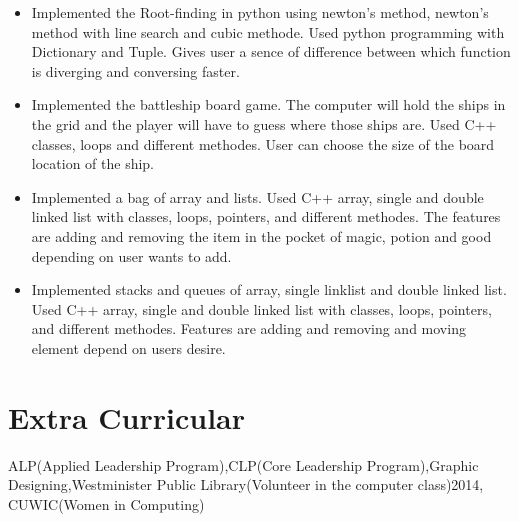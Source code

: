 \documentclass[10pt,a4paper,sans]{moderncv} %
\begin{document}
\begin{itemize}
\vspace{-6mm}
\item{Implemented the Root-finding in python using newton's method, newton's method with line search and cubic methode. Used python programming with Dictionary and Tuple. Gives user a sence of difference between which function is diverging and conversing faster.}
\end{itemize}
\begin{itemize}
\vspace{-6mm}
\item{Implemented the battleship board game. The computer will hold the ships in the grid and the player will have to guess where those ships are. Used C++ classes, loops and different methodes. User can choose the size of the board location of the ship.}
\end{itemize}
\begin{itemize}
\vspace{-6mm}
\item{Implemented a bag of array and lists. Used C++ array, single and double linked list with classes, loops, pointers, and different methodes. The features are adding and removing the item in the pocket of magic, potion and good depending on user wants to add.}
\end{itemize}
\begin{itemize}
\vspace{-6mm}
\item{Implemented stacks and queues of array, single linklist and double linked list. Used C++ array, single and double linked list with classes, loops, pointers, and different methodes. Features are adding and removing and moving element depend on users desire.}
\end{itemize}
\vspace{-5mm}
\section{Extra Curricular}
\vspace{-2mm}
ALP(Applied Leadership Program),CLP(Core Leadership Program),Graphic Designing,Westminister Public Library(Volunteer in the computer class)2014, CUWIC(Women in Computing)


\end{document}
